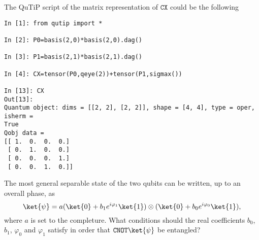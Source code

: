 \begin{solution}
The QuTiP script of the matrix representation of $\mathtt{CX}$ could be 
the following 
\end{solution}
\begin{lstlisting}
In [1]: from qutip import *

In [2]: P0=basis(2,0)*basis(2,0).dag()

In [3]: P1=basis(2,1)*basis(2,1).dag()

In [4]: CX=tensor(P0,qeye(2))+tensor(P1,sigmax())

In [13]: CX
Out[13]: 
Quantum object: dims = [[2, 2], [2, 2]], shape = [4, 4], type = oper, isherm = 
True
Qobj data =
[[ 1.  0.  0.  0.]
 [ 0.  1.  0.  0.]
 [ 0.  0.  0.  1.]
 [ 0.  0.  1.  0.]]
\end{lstlisting}

\begin{exercise}
The most general separable state of the two qubits can be written, up to an
overall phase, as%
\begin{equation}
\ket{\psi}=a(\ket{0} +b_1e^{i\varphi_1}\ket{1})\otimes(\ket{0}
+b_0e^{i\varphi_0}\ket{1}),
\end{equation}
where $a$ is set to the completure. What conditions should the real
coefficients $b_0$, $b_1$, $\varphi_0$ and $\varphi_1$ satisfy in
order that $\mathtt{CNOT}\ket{\psi}$ be entangled?
\end{exercise}

